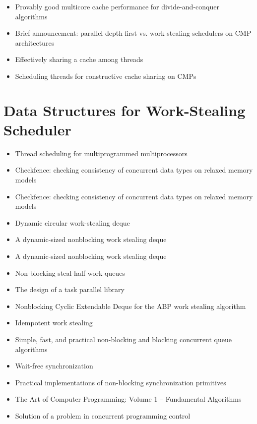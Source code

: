 \begin{itemize}
\item Provably good multicore cache performance for divide-and-conquer
  algorithms \cite{Blelloch2008}
\item Brief announcement: parallel depth first vs. work stealing
  schedulers on CMP architectures \cite{Liaskovitis2006}
\item Effectively sharing a cache among threads \cite{Blelloch2004}
\item Scheduling threads for constructive cache sharing on CMPs
  \cite{Chen2007}
\end{itemize}


\section*{Data Structures for Work-Stealing Scheduler}
\label{sec:lr-data-structures-for-work-stealing-scheduler}

\begin{itemize}
\item[\checkmark] Thread scheduling for multiprogrammed
  multiprocessors \cite{Arora2001}
\item Checkfence: checking consistency of concurrent data types on
  relaxed memory models \cite{Burckhardt2007}
\item Checkfence: checking consistency of concurrent data types on
  relaxed memory models \cite{Burckhardt2007a}
\item Dynamic circular work-stealing deque \cite{Chase2005}
\item A dynamic-sized nonblocking work stealing deque
  \cite{Hendler2006}
\item A dynamic-sized nonblocking work stealing deque
  \cite{Hendler2006a}
\item Non-blocking steal-half work queues \cite{Hendler2002}
\item The design of a task parallel library \cite{Leijen2009}
\item Nonblocking Cyclic Extendable Deque for the ABP work stealing
  algorithm \cite{Lev2005}
\item Idempotent work stealing \cite{Michael2009}
\item Simple, fast, and practical non-blocking and blocking concurrent
  queue algorithms \cite{Michael1996}
\item[\checkmark] Wait-free synchronization \cite{Herlihy1991}
\item[\checkmark] Practical implementations of non-blocking
  synchronization primitives \cite{Moir1997}
\item The Art of Computer Programming: Volume 1 -- Fundamental
  Algorithms \cite{Knuth1997}
\item Solution of a problem in concurrent programming control
  \cite{Dijkstra1965}
\end{itemize}


